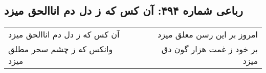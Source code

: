 \begin{center}
\section*{رباعی شماره ۴۹۴: آن کس که ز دل دم اناالحق میزد}
\label{sec:0494}
\begin{longtable}{l p{0.5cm} r}
آن کس که ز دل دم اناالحق میزد
&&
امروز بر این رسن معلق میزد
\\
وانکس که ز چشم سحر مطلق میزد
&&
بر خود ز غمت هزار گون دق میزد
\\
\end{longtable}
\end{center}
